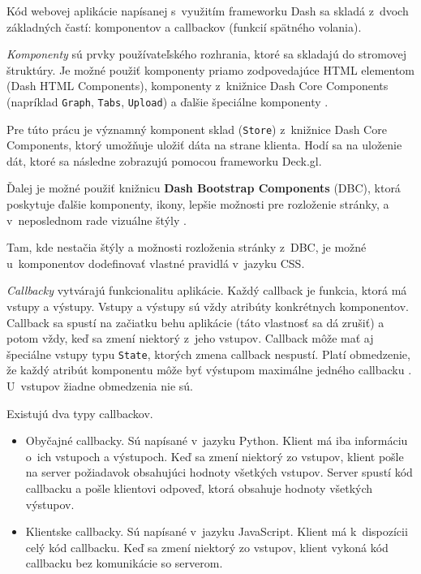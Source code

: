 Kód webovej aplikácie napísanej s~využitím frameworku Dash sa skladá z~dvoch základných častí: komponentov a callbackov (funkcií spätného volania).

\emph{Komponenty} sú prvky používateľského rozhrania, ktoré sa skladajú do stromovej štruktúry. Je možné použiť komponenty priamo zodpovedajúce HTML elementom (Dash HTML Components), komponenty z~knižnice Dash Core Components (napríklad \texttt{Graph}, \texttt{Tabs}, \texttt{Upload}) a ďalšie špeciálne komponenty \cite{dash_documentation}.

Pre túto prácu je významný komponent sklad (\texttt{Store}) z~knižnice Dash Core Components, ktorý umožňuje uložiť dáta na strane klienta. Hodí sa na uloženie dát, ktoré sa následne zobrazujú pomocou frameworku Deck.gl.

Ďalej je možné použiť knižnicu \textbf{Dash Bootstrap Components} (DBC), ktorá poskytuje ďalšie komponenty, ikony, lepšie možnosti pre rozloženie stránky, a v~neposlednom rade vizuálne štýly \cite{dbc_documentation}.

Tam, kde nestačia štýly a možnosti rozloženia stránky z~DBC, je možné u~komponentov dodefinovať vlastné pravidlá v~jazyku CSS.

\emph{Callbacky} vytvárajú funkcionalitu aplikácie. Každý callback je funkcia, ktorá má vstupy a výstupy. Vstupy a výstupy sú vždy atribúty konkrétnych komponentov. Callback sa spustí na začiatku behu aplikácie (táto vlastnosť sa dá zrušiť) a potom vždy, keď sa zmení niektorý z~jeho vstupov. Callback môže mať aj špeciálne vstupy typu \texttt{State}, ktorých zmena callback nespustí. Platí obmedzenie, že každý atribút komponentu môže byť výstupom maximálne jedného callbacku \cite{dash_documentation}. U~vstupov žiadne obmedzenia nie sú.

Existujú dva typy callbackov.
\begin{itemize}
    \item Obyčajné callbacky. Sú napísané v~jazyku Python. Klient má iba informáciu o~ich vstupoch a výstupoch. Keď sa zmení niektorý zo vstupov, klient pošle na server požiadavok obsahujúci hodnoty všetkých vstupov. Server spustí kód callbacku a pošle klientovi odpoveď, ktorá obsahuje hodnoty všetkých výstupov.
    \item Klientske callbacky. Sú napísané v~jazyku JavaScript. Klient má k~dispozícii celý kód callbacku. Keď sa zmení niektorý zo vstupov, klient vykoná kód callbacku bez komunikácie so serverom.
\end{itemize}

